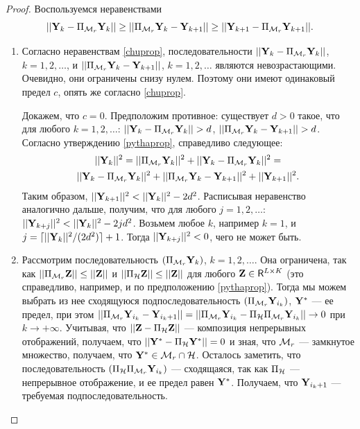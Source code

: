 \documentclass[12pt,a4paper,fleqn,leqno]{article}
\begin{document}
\begin{proof}
Воспользуемся неравенствами \cite{Chu.etal2003}
\begin{equation}
\label{chuprop}
||\mathbf{Y}_k - \Pi_{\mathcal{M}_r} \mathbf{Y}_k|| \ge ||\Pi_{\mathcal{M}_r} \mathbf{Y}_k - \mathbf{Y}_{k + 1}|| \ge ||\mathbf{Y}_{k+1} - \Pi_{\mathcal{M}_r} \mathbf{Y}_{k + 1}||.
\end{equation}

\begin{enumerate}
\item Согласно неравенствам \eqref{chuprop}, последовательности $||\mathbf{Y}_k - \Pi_{\mathcal{M}_r} \mathbf{Y}_k||$, $k = 1, 2, \ldots$, и $||\Pi_{\mathcal{M}_r} \mathbf{Y}_k - \mathbf{Y}_{k + 1}||$, $k = 1, 2, \ldots$ являются невозрастающими. Очевидно, они ограничены снизу нулем. Поэтому они имеют одинаковый предел $c$, опять же согласно \eqref{chuprop}.

Докажем, что $c = 0$. Предположим противное: существует $d > 0$ такое, что для любого $k = 1, 2, \ldots$: $||\mathbf{Y}_k - \Pi_{\mathcal{M}_r} \mathbf{Y}_k|| > d$, $||\Pi_{\mathcal{M}_r} \mathbf{Y}_k - \mathbf{Y}_{k + 1}|| > d$. Согласно утверждению \ref{pythaprop}, справедливо следующее:
\begin{gather*}
||\mathbf{Y}_k||^2 = ||\Pi_{\mathcal{M}_r} \mathbf{Y}_k||^2 + ||\mathbf{Y}_k - \Pi_{\mathcal{M}_r} \mathbf{Y}_k||^2 =\\ ||\mathbf{Y}_k - \Pi_{\mathcal{M}_r} \mathbf{Y}_k||^2 + ||\Pi_{\mathcal{M}_r} \mathbf{Y}_k - \mathbf{Y}_{k + 1}||^2 + ||\mathbf{Y}_{k + 1}||^2.
\end{gather*}
Таким образом, $||\mathbf{Y}_{k+1}||^2 < ||\mathbf{Y}_k||^2 - 2d^2$. Расписывая неравенство аналогично дальше, получим, что для любого $j = 1, 2, \ldots$: $||\mathbf{Y}_{k+j}||^2 < ||\mathbf{Y}_k||^2 - 2 j d^2$. Возьмем любое $k$, например $k = 1$, и $j = \lceil ||\mathbf{Y}_k||^2 / (2d^2) \rceil + 1$. Тогда $||\mathbf{Y}_{k+j}||^2 < 0$, чего не может быть.
\item Рассмотрим последовательность $(\Pi_{\mathcal{M}_r} \mathbf{Y}_k)$, $k = 1, 2, \ldots$. Она ограничена, так как $||\Pi_{\mathcal{M}_r} \mathbf{Z}|| \le ||\mathbf{Z}||$ и $||\Pi_{\mathcal{H}} \mathbf{Z}|| \le ||\mathbf{Z}||$ для любого $\mathbf{Z} \in \mathsf{R}^{L \times K}$ (это справедливо, например, и по предположению \ref{pythaprop}). Тогда мы можем выбрать из нее сходящуюся подпоследовательность $(\Pi_{\mathcal{M}_r} \mathbf{Y}_{i_k})$, $\mathbf{Y}^*$ --- ее предел, при этом $||\Pi_{\mathcal{M}_r} \mathbf{Y}_{i_k} - \mathbf{Y}_{i_k + 1}|| = ||\Pi_{\mathcal{M}_r} \mathbf{Y}_{i_k} - \Pi_{\mathcal{H}} \Pi_{\mathcal{M}_r} \mathbf{Y}_{i_k}|| \to 0$ при $k \to + \infty$. Учитывая, что $||\mathbf{Z} - \Pi_{\mathcal{H}} \mathbf{Z}||$ --- композиция непрерывных отображений, получаем, что $||\mathbf{Y}^* - \Pi_{\mathcal{H}} \mathbf{Y}^*|| = 0$ и зная, что $\mathcal{M}_r$ --- замкнутое множество, получаем, что $\mathbf{Y}^* \in \mathcal{M}_r \cap \mathcal{H}$. Осталось заметить, что последовательность $(\Pi_{\mathcal{H}} \Pi_{\mathcal{M}_r} \mathbf{Y}_{i_k})$ --- сходящаяся, так как $\Pi_{\mathcal{H}}$ --- непрерывное отображение, и ее предел равен $\mathbf{Y}^*$. Получаем, что $\mathbf{Y}_{i_k + 1}$ --- требуемая подпоследовательность.
\end{enumerate}
\end{proof}
\end{document}

